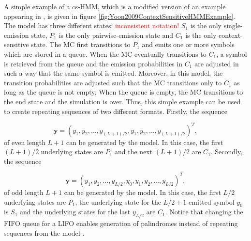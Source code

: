 \documentclass{article}\usepackage[]{graphicx}\usepackage[]{color}
\begin{document}
A simple example of a cs-HMM, which is a modified version of an example appearing in \cite{Yoon2009}, is given in figure \ref{fig:Yoon2009ContextSensitiveHMMExample}. The model has three different states: \textcolor{red}{inconsistent notation!} $S_1$ is the only single-emission state, $P_1$ is the only pairwise-emission state and $C_1$ is the only context-sensitive state. The MC first transitions to $P_1$ and emits one or more symbols which are stored in a queue. When the MC eventually transitions to $C_1$, a symbol is retrieved from the queue and the emission probabilities in $C_1$ are adjusted in such a way that the same symbol is emitted. Moreover, in this model, the transition probabilities are adjusted such that the MC transitions only to $C_1$ as long as the queue is not empty. When the queue is empty, the MC transitions to the end state and the simulation is over. Thus, this simple example can be used to create repeating sequences of two different formats. Firstly, the sequence 

\begin{equation*}
    \mathbf{y} = (y_1, y_2, \ldots, y_{(L+1)/2}, y_1, y_2, \ldots, y_{(L+1)/2})^T, 
\end{equation*}
of even length $L+1$ can be generated by the model. In this case, the first $(L+1)/2$ underlying states are $P_1$ and the next $(L+1)/2$ are $C_1$. Secondly, the sequence 

\begin{equation*}
    \mathbf{y} = (y_1, y_2, \ldots, y_{L/2}, y_0, y_1, y_2, \ldots, y_{L/2})^T,
\end{equation*}
of odd length $L+1$ can be generated by the model. In this case, the first $L/2$ underlying states are $P_1$, the underlying state for the $L/2 + 1$ emitted symbol $y_0$ is $S_1$ and the underlying states for the last $y_{L/2}$ are $C_1$. Notice that changing the FIFO queue for a LIFO enables generation of  palindromes instead of repeating sequences from the model \cite{Yoon2009}. 
\end{document}
